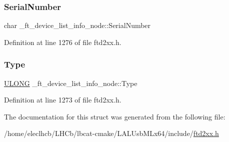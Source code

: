 \subsubsection{\texorpdfstring{Serial\+Number}{SerialNumber}}
{\footnotesize\ttfamily char \+\_\+ft\+\_\+device\+\_\+list\+\_\+info\+\_\+node\+::\+Serial\+Number}



Definition at line 1276 of file ftd2xx.\+h.

\mbox{\label{struct__ft__device__list__info__node_aa764a1406eb904ad4444a82f2f950b4e}} 
\subsubsection{\texorpdfstring{Type}{Type}}
{\footnotesize\ttfamily \hyperlink{CatCaloProto40MHz_2inc_2WinTypes_8h_af632da489ebc3708ec3ab6791ee53fa4}{U\+L\+O\+NG} \+\_\+ft\+\_\+device\+\_\+list\+\_\+info\+\_\+node\+::\+Type}



Definition at line 1273 of file ftd2xx.\+h.



The documentation for this struct was generated from the following file\+:\begin{DoxyCompactItemize}
\item 
/home/eleclhcb/\+L\+H\+Cb/lbcat-\/cmake/\+L\+A\+L\+Usb\+M\+Lx64/include/\hyperlink{LALUsbMLx64_2include_2ftd2xx_8h}{ftd2xx.\+h}\end{DoxyCompactItemize}

